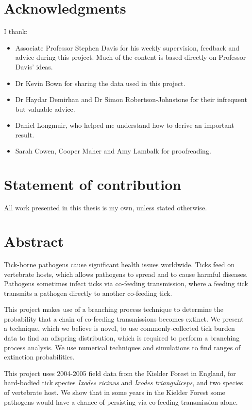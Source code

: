 \documentclass[hidelinks]{article}
\begin{document}
\section*{Acknowledgments}
I thank:
\begin{itemize}
\item Associate Professor Stephen Davis for his weekly supervision, feedback and advice during this project. Much of the content is based directly on Professor Davis' ideas.
\item Dr Kevin Bown for sharing the data used in this project.
\item Dr Haydar Demirhan and Dr Simon Robertson-Johnstone for their infrequent but valuable advice.
\item Daniel Longmuir, who helped me understand how to derive an important result.
\item Sarah Cowen, Cooper Maher and Amy Lambalk for proofreading. 
\end{itemize}

\section*{Statement of contribution}

All work presented in this thesis is my own, unless stated otherwise.

\thispagestyle{empty}
\addtocounter{page}{-1}

\newpage

\section*{Abstract}

Tick-borne pathogens cause significant health issues worldwide. Ticks feed on vertebrate hosts, which allows pathogens to spread and to cause harmful diseases. Pathogens sometimes infect ticks via co-feeding transmission, where a feeding tick transmits a pathogen directly to another co-feeding tick.

This project makes use of a branching process technique to determine the probability that a chain of co-feeding transmissions becomes extinct. We present a technique, which we believe is novel, to use commonly-collected tick burden data to find an offspring distribution, which is required to perform a branching process analysis. We use numerical techniques and simulations to find ranges of extinction probabilities.

This project uses 2004-2005 field data from the Kielder Forest in England, for hard-bodied tick species \textit{Ixodes ricinus} and \textit{Ixodes trianguliceps}, and two species of vertebrate host. We show that in some years in the Kielder Forest some pathogens would have a chance of persisting via co-feeding transmission alone.
\end{document}
